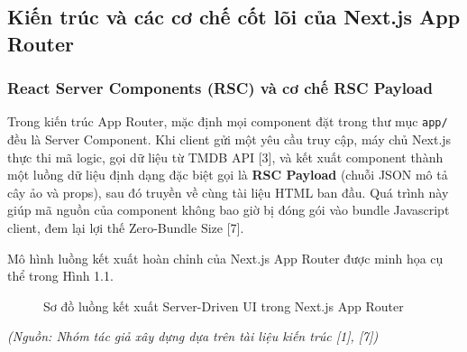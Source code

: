 \documentclass[13pt,a4paper]{extarticle}
\begin{document}
\subsection{Kiến trúc và các cơ chế cốt lõi của Next.js App Router}

\subsubsection{React Server Components (RSC) và cơ chế RSC Payload}
Trong kiến trúc App Router, mặc định mọi component đặt trong thư mục \texttt{app/} đều là Server Component. Khi client gửi một yêu cầu truy cập, máy chủ Next.js thực thi mã logic, gọi dữ liệu từ TMDB API [3], và kết xuất component thành một luồng dữ liệu định dạng đặc biệt gọi là \textbf{RSC Payload} (chuỗi JSON mô tả cây ảo và props), sau đó truyền về cùng tài liệu HTML ban đầu. Quá trình này giúp mã nguồn của component không bao giờ bị đóng gói vào bundle Javascript client, đem lại lợi thế Zero-Bundle Size [7].

Mô hình luồng kết xuất hoàn chỉnh của Next.js App Router được minh họa cụ thể trong Hình 1.1.

\begin{figure}[H]
\centering
{}
\caption{Sơ đồ luồng kết xuất Server-Driven UI trong Next.js App Router}
\label{fig:render_pipeline}
\end{figure}
\begin{flushleft}\small\textit{(Nguồn: Nhóm tác giả xây dựng dựa trên tài liệu kiến trúc [1], [7])}\end{flushleft}
\end{document}
